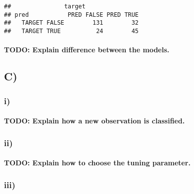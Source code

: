 \documentclass[
]{article}
\begin{document}
\begin{verbatim}
##               target
## pred           PRED FALSE PRED TRUE
##   TARGET FALSE        131        32
##   TARGET TRUE          24        45
\end{verbatim}

\hypertarget{todo-explain-difference-between-the-models.}{%
\paragraph{TODO: Explain difference between the
models.}\label{todo-explain-difference-between-the-models.}}

\hypertarget{c-1}{%
\subsection{C)}\label{c-1}}

\hypertarget{i-2}{%
\subsubsection{i)}\label{i-2}}

\hypertarget{todo-explain-how-a-new-observation-is-classified.}{%
\paragraph{TODO: Explain how a new observation is
classified.}\label{todo-explain-how-a-new-observation-is-classified.}}

\hypertarget{ii-2}{%
\subsubsection{ii)}\label{ii-2}}

\hypertarget{todo-explain-how-to-choose-the-tuning-parameter.}{%
\paragraph{TODO: Explain how to choose the tuning
parameter.}\label{todo-explain-how-to-choose-the-tuning-parameter.}}

\hypertarget{iii}{%
\subsubsection{iii)}\label{iii}}
\end{document}
